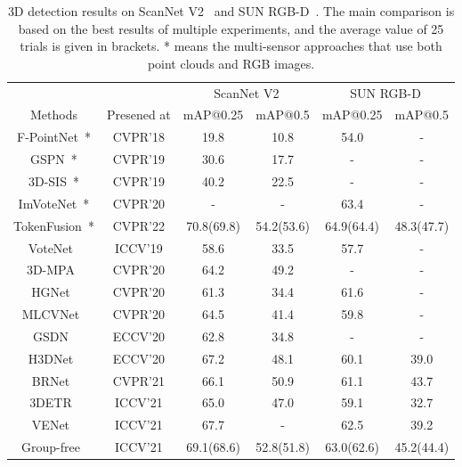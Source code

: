 \documentclass{article}
\begin{document}
\begin{table}
  \caption{3D detection results on ScanNet V2~\cite{dai2017scannet} and SUN RGB-D~\cite{sunrgbd}. The main comparison is based on the best results of multiple experiments, and the average value of 25 trials is given in brackets. * means the multi-sensor approaches that use both point clouds and RGB images.}
  \label{tab:results}
  \centering
  \begin{tabular}{cccccc}
    \toprule
    & & \multicolumn{2}{c}{ScanNet V2} & \multicolumn{2}{c}{SUN RGB-D} \\
    \cmidrule(r){3-6}
    \multirow{-2}{*}{Methods}     & \multirow{-2}{*}{Presened at}    & mAP@0.25 & mAP@0.5 & mAP@0.25 & mAP@0.5\\
    \midrule
    F-PointNet~\cite{qi2018frustum}*   			& CVPR'18  & 19.8 & 10.8 & 54.0 & -   \\
	GSPN~\cite{yi2018gspn}*                     & CVPR'19  & 30.6 & 17.7 & -    & -   \\
	3D-SIS~\cite{hou20193d}*       				& CVPR'19  & 40.2 & 22.5 & -    & -   \\
	ImVoteNet~\cite{qi2020imvotenet}*       		& CVPR'20  & -    & -    & 63.4 & -   \\
TokenFusion~\cite{wang2022multimodal}*      &CVPR'22   & 70.8(69.8) & 54.2(53.6) & 64.9(64.4) & 48.3(47.7)\\
	\midrule
	VoteNet~\cite{qi2019deep}                   & ICCV'19  & 58.6 & 33.5 & 57.7 & -   \\
	3D-MPA~\cite{engelmann20203d}       			& CVPR'20  & 64.2 & 49.2 & -    & -   \\
	HGNet~\cite{chen2020hierarchical}        	& CVPR'20  & 61.3 & 34.4 & 61.6 & -   \\
	MLCVNet~\cite{xie2020mlcvnet}               & CVPR'20  & 64.5 & 41.4 & 59.8 & -   \\
	GSDN~\cite{gwak2020generative}              & ECCV'20  & 62.8 & 34.8 & -    & -   \\
	H3DNet~\cite{zhang2020h3dnet}       			& ECCV'20  & 67.2 & 48.1 & 60.1 & 39.0\\
	BRNet~\cite{cheng2021back}        			& CVPR'21  & 66.1 & 50.9 & 61.1 & 43.7\\
	3DETR~\cite{misra2021end}        			& ICCV'21  & 65.0 & 47.0 & 59.1 & 32.7\\
	VENet~\cite{xie2021venet}        			& ICCV'21  & 67.7 & -    & 62.5 & 39.2\\
	Group-free~\cite{liu2021group}   			& ICCV'21  & 69.1(68.6) & 52.8(51.8) & 63.0(62.6) & 45.2(44.4)\\

\end{tabular}
\end{table}
\end{document}
